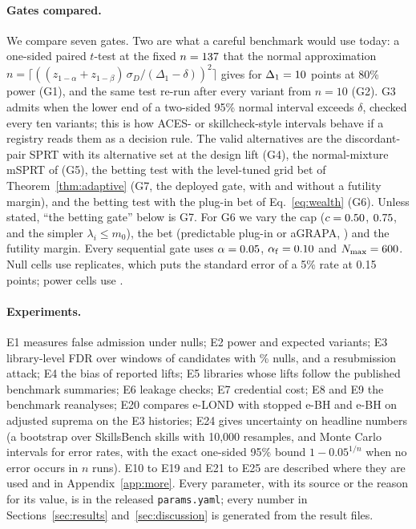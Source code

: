 \paragraph{Gates compared.} We compare seven gates. Two are what a careful benchmark would use today: a one-sided paired $t$-test at the fixed $n=137$ that the normal approximation $n=\lceil((z_{1-\alpha}+z_{1-\beta})\,\sigma_D/(\Delta_1-\delta))^2\rceil$ gives for $\Delta_1=10$ points at 80\% power (G1), and the same test re-run after every variant from $n=10$ (G2). G3 admits when the lower end of a two-sided 95\% normal interval exceeds $\delta$, checked every ten variants; this is how ACES- or skillcheck-style intervals behave if a registry reads them as a decision rule. The valid alternatives are the discordant-pair SPRT with its alternative set at the design lift (G4), the normal-mixture mSPRT of \citet{johari2022always} (G5), the betting test with the level-tuned grid bet of Theorem~\ref{thm:adaptive} (G7, the deployed gate, with and without a futility margin), and the betting test with the plug-in bet of Eq.~\eqref{eq:wealth} (G6). Unless stated, ``the betting gate'' below is G7. For G6 we vary the cap ($c=0.50$, $0.75$, and the simpler $\lambda_i\le m_0$), the bet (predictable plug-in or aGRAPA, \citealp{waudbysmith2024betting}) and the futility margin. Every sequential gate uses $\alpha=0.05$, $\alpha_{\mathrm f}=0.10$ and $N_{\max}=600$. Null cells use \PReps{} replicates, which puts the standard error of a 5\% rate at 0.15 points; power cells use \PRepsPower.

\paragraph{Experiments.} E1 measures false admission under nulls; E2 power and expected variants; E3 library-level FDR over \PWindows{} windows of \PWindow{} candidates with \PNullShare\% nulls, and a resubmission attack; E4 the bias of reported lifts; E5 libraries whose lifts follow the published benchmark summaries; E6 leakage checks; E7 credential cost; E8 and E9 the benchmark reanalyses; E20 compares e-LOND with stopped e-BH and e-BH on adjusted suprema on the E3 histories; E24 gives uncertainty on headline numbers (a bootstrap over SkillsBench skills with 10{,}000 resamples, and Monte Carlo intervals for error rates, with the exact one-sided 95\% bound $1-0.05^{1/n}$ when no error occurs in $n$ runs). E10 to E19 and E21 to E25 are described where they are used and in Appendix~\ref{app:more}. Every parameter, with its source or the reason for its value, is in the released \texttt{params.yaml}; every number in Sections~\ref{sec:results} and~\ref{sec:discussion} is generated from the result files.
